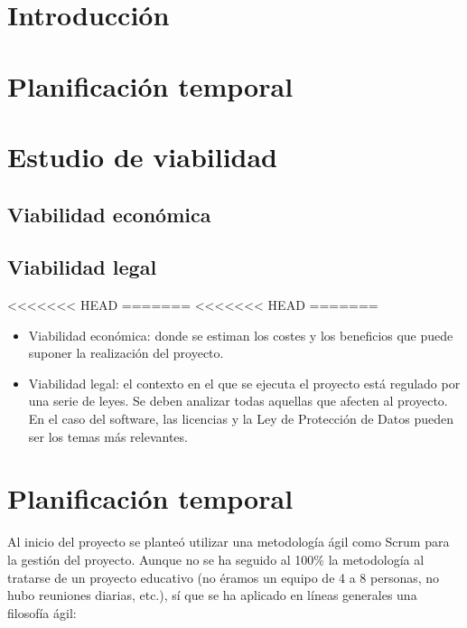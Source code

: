 
\section{Introducción}

\section{Planificación temporal}

\section{Estudio de viabilidad}

\subsection{Viabilidad económica}

\subsection{Viabilidad legal}


<<<<<<< HEAD
=======
<<<<<<< HEAD
=======
\begin{itemize}
\tightlist
\item
  Viabilidad económica: donde se estiman los costes y los beneficios que
  puede suponer la realización del proyecto.
\item
  Viabilidad legal: el contexto en el que se ejecuta el proyecto está
  regulado por una serie de leyes. Se deben analizar todas aquellas que
  afecten al proyecto. En el caso del software, las licencias y la Ley
  de Protección de Datos pueden ser los temas más relevantes.
\end{itemize}

\section{Planificación temporal}\label{planificacion-temporal}

Al inicio del proyecto se planteó utilizar una metodología ágil como
Scrum para la gestión del proyecto. Aunque no se ha seguido al 100\% la
metodología al tratarse de un proyecto educativo (no éramos un equipo de
4 a 8 personas, no hubo reuniones diarias, etc.), sí que se ha aplicado
en líneas generales una filosofía ágil:

